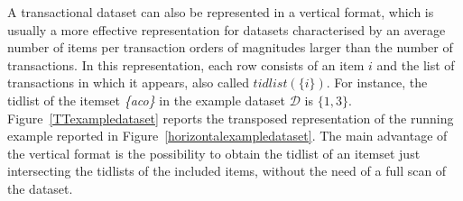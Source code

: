 A transactional dataset can also be represented in a vertical format, which is
usually a more effective representation for datasets characterised by an average
number of items per transaction orders of magnitudes larger than the number of
transactions.
In this representation, each
row consists of an item $i$ and the list of transactions in which it appears,
also called $tidlist(\{i\})$.
For instance, the tidlist of the itemset \textit{\{aco\}} in
the example dataset $\mathcal{D}$ is $\{1,3\}$.
Figure~\ref{TTexampledataset} reports the transposed representation of the
running example reported in Figure~\ref{horizontalexampledataset}. The main
advantage of the vertical format is the possibility to obtain the tidlist of
an itemset just intersecting the tidlists of the included items, without the
need of a full scan of the dataset.


